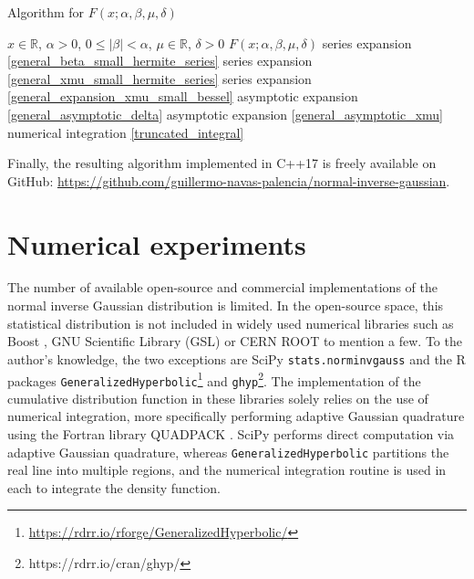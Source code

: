 \documentclass[10pt,a4paper,oneside]{article}
\numberwithin{equation}{section}
\begin{document}

{\centering
\begin{minipage}{.85\linewidth}
  \begin{algorithm}[H]
  \small
  \caption{Algorithm for $F(x; \alpha, \beta, \mu, \delta)$}\label{alg:case_general}
\begin{algorithmic}
\Require $x \in \mathbb{R}$, $\alpha > 0$, $0 \le |\beta| < \alpha$, $\mu \in \mathbb{R}$, $\delta > 0$
\Ensure $F(x; \alpha, \beta, \mu, \delta)$
    \State series expansion \eqref{general_beta_small_hermite_series}
    \State series expansion \eqref{general_xmu_small_hermite_series}
	\State series expansion \eqref{general_expansion_xmu_small_bessel}
	\State asymptotic expansion \eqref{general_asymptotic_delta}
	\State asymptotic expansion \eqref{general_asymptotic_xmu}
\Else
	\State numerical integration \eqref{truncated_integral}
\EndIf
\end{algorithmic}
  \end{algorithm}
\end{minipage}
\par
}
\vspace{5mm}
Finally, the resulting algorithm implemented in C++17 is freely available on GitHub: \url{https://github.com/guillermo-navas-palencia/normal-inverse-gaussian}.

\section{Numerical experiments}
The number of available open-source and commercial implementations of the normal inverse Gaussian distribution is limited. In the open-source space, this statistical distribution is not included in widely used numerical libraries such as Boost \cite{BoostLibrary}, GNU Scientific Library (GSL) \cite{GSL} or CERN ROOT \cite{ROOT} to mention a few. To the author's knowledge, the two exceptions are SciPy \texttt{stats.norminvgauss} \cite{scipy} and the R packages \texttt{GeneralizedHyperbolic}\footnote{\url{https://rdrr.io/rforge/GeneralizedHyperbolic/}} and \texttt{ghyp}\footnote{https://rdrr.io/cran/ghyp/}. The implementation of the cumulative distribution function in these libraries solely relies on the use of numerical integration, more specifically performing adaptive Gaussian quadrature using the Fortran library QUADPACK \cite{QUADPACK}. SciPy performs direct computation via adaptive Gaussian quadrature, whereas \texttt{GeneralizedHyperbolic} partitions the real line into multiple regions, and the numerical integration routine is used in each to integrate the density function.
\end{document}
